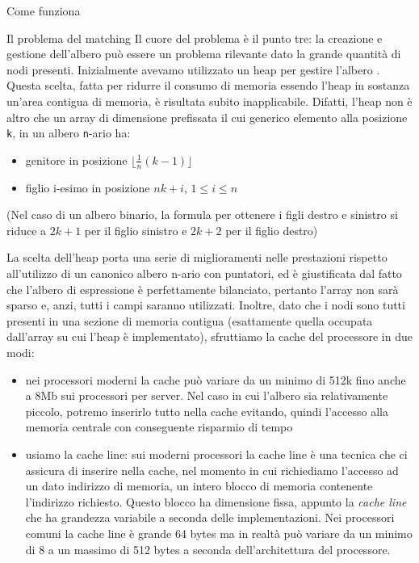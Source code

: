 \begin{chapter}{Come funziona}
\begin{section}{Il problema del matching}
Il cuore del problema \`e il punto tre: la creazione e gestione dell'albero pu\`o
essere un problema rilevante dato la grande quantit\`a di nodi presenti. Inizialmente
avevamo utilizzato un heap per gestire l'albero \cite{Skiena08}.
Questa scelta, fatta per ridurre il consumo di memoria essendo l'heap in sostanza un'area
contigua di memoria, \`e risultata subito inapplicabile.
Difatti, l'heap non \`e altro che un array di dimensione prefissata il cui generico
elemento alla posizione \verb,k,, in un albero \verb,n,-ario ha:

\begin{itemize}
	\item genitore in posizione $\lfloor\frac{1}{n}(k-1)\rfloor$
	\item figlio i-esimo in posizione $nk+i$, $1 \leq i \leq n$
\end{itemize}

\noindent(Nel caso di un albero binario, la formula per ottenere i figli destro e sinistro
si riduce a $2k+1$ per il figlio sinistro e $2k+2$ per il figlio destro)

La scelta dell'heap porta una serie di miglioramenti nelle prestazioni rispetto
all'utilizzo di un canonico albero n-ario con puntatori, ed \`e giustificata
dal fatto che l'albero di espressione \`e perfettamente bilanciato, pertanto
l'array non sar\`a sparso e, anzi, tutti i campi saranno utilizzati. Inoltre,
dato che i nodi sono tutti presenti in una sezione di memoria contigua (esattamente
quella occupata dall'array su cui l'heap \`e implementato), sfruttiamo la cache
del processore in due modi:

\begin{itemize}
	\item nei processori moderni la cache pu\`o variare da un minimo
          di 512k fino anche a 8Mb sui processori per server. Nel caso in cui l'albero sia
          relativamente piccolo, potremo inserirlo tutto nella cache evitando,
          quindi l'accesso alla memoria centrale con conseguente risparmio di tempo
	\item usiamo la cache line: sui moderni processori la cache line \`e una tecnica
          che ci assicura di inserire nella cache, nel momento in cui richiediamo l'accesso
          ad un dato indirizzo di memoria, un intero blocco di memoria contenente
          l'indirizzo richiesto. Questo blocco ha dimensione fissa, appunto la
          \textit{cache line} che ha grandezza variabile a seconda delle implementazioni.
          Nei processori comuni la cache line \`e grande 64 bytes ma in realt\`a
          pu\`o variare da un minimo di 8 a un massimo di 512 bytes a seconda dell'architettura
          del processore.
\end{itemize}


\end{section}
\end{chapter}
